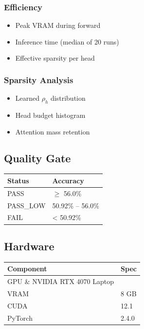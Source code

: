 \subsubsection{Efficiency}
\begin{itemize}
\item Peak VRAM during forward
\item Inference time (median of 20 runs)
\item Effective sparsity per head

\end{itemize}
\subsubsection{Sparsity Analysis}
\begin{itemize}
\item Learned $\rho_h$ distribution
\item Head budget histogram
\item Attention mass retention

\end{itemize}
\subsection{Quality Gate}

\begin{table}[H]
\centering
\small
\begin{tabular}{ll}
\toprule
\textbf{Status} & \textbf{Accuracy} \\
\midrule
PASS & $\ge$ 56.0\% \\
PASS\_LOW & 50.92\% -- 56.0\% \\
FAIL & < 50.92\% \\
\bottomrule
\end{tabular}
\end{table}

\subsection{Hardware}

\begin{table}[H]
\centering
\small
\begin{tabular}{ll}
\toprule
\textbf{Component} & \textbf{Spec} \\
\midrule
GPU \& NVIDIA RTX 4070 Laptop \\
VRAM & 8 GB \\
CUDA & 12.1 \\
PyTorch & 2.4.0 \\
\bottomrule
\end{tabular}
\end{table}

